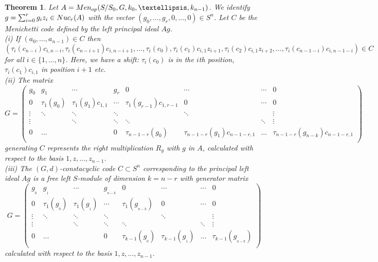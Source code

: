 \documentclass[11pt]{amsart}
\theoremstyle{plain}
\newtheorem{theorem}{Theorem}[section]
\theoremstyle{definition}
\begin{document}
\begin{theorem}\label{thm:newTheorem3.2}
Let $A={\rm Men}_{op}(S/S_0,G, k_0,\dots,k_{n-1})$.  We identify $g=\sum_{i=0}^{r}g_iz_i\in {\rm Nuc}_r(A)$
with the vector $(g_0,\dots,g_{r},0,\dots,0)\in S^n$. Let $C$ be the Menichetti code defined by the left principal ideal $Ag$.
\\ (i)  If $(a_0,\dots,a_{n-1})\in C$ then
$$( \tau_i(c_{n-i}) c_{i,n-i}  ,  \tau_i(c_{n-i+1}) c_{i,n-i+1} ,\dots, \tau_i(c_0), \tau_i(c_1) c_{i,1} z_{i+1}, \tau_i(c_2) c_{i,1} z_{i+2},\dots, \tau_i(c_{n-1-i}) c_{i,n-1-i} ) \in  C$$
for all $i\in \{1,\dots,n \}$.
 Here, we have a shift: $ \tau_i(c_0) $ is in the $i$th position, $\tau_i(c_1) c_{i,1} $ in position $i+1$ etc.
\\ (ii)
 The matrix
 $$G= \left(
 \begin{array}{cccccccc}
 g_{0} &g_{1} &        \cdots&          g_{r}& 0 &\cdots &\cdots & 0\\
 0 & \tau_1(g_{0}) & \tau_1(g_{1})c_{1,1} &\cdots & \tau_{1}(g_{r-1})c_{1,r-1} & 0 &\cdots & 0\\
 \vdots &\ddots &\ddots &\ddots & &\ddots & &\vdots\\
 \vdots & &\ddots &\ddots &\ddots & &\ddots &\vdots\\
 0 &\ldots & &0 & \tau_{n-1-r}(g_{0}) & \tau_{n-1-r}(g_{1})c_{n-1-r,1} &\ldots & \tau_{n-1-r}(g_{{n-k}})c_{n-1-r,1} \\
 \end{array}
 \right)
 $$
  generating $C$ represents the right multiplication $R_g$ with $g$ in $A$,
calculated with respect to the basis $1,z,\dots,z_{n-1}$.
\\ (iii)
The $(G,d)$-constacyclic code $C\subset S^n$ corresponding to the principal left ideal
$Ag $ is a free left $S$-module of dimension $k=n-r$ with generator matrix
$$
 G= \left(
 \begin{array}{cccccccc}
 g_{_0} &g_{_1} &\cdots&g_{_{n-k}}& 0 &\cdots &\cdots & 0\\
 0 & \tau_1(g_{_0}) & \tau_1(g_{_1}) &\cdots & \tau_{1}(g_{_{n-k}}) & 0 &\cdots & 0\\
 \vdots &\ddots &\ddots &\ddots & &\ddots & &\vdots\\
 \vdots & &\ddots &\ddots &\ddots & &\ddots &\vdots\\
 0 &\ldots & &0 & \tau_{k-1}(g_{_0}) & \tau_{k-1}(g_{_1}) &\ldots & \tau_{k-1}(g_{_{n-k}})\\
 \end{array}
 \right)
 $$
calculated with respect to the basis $1,z,\dots,z_{n-1}$.
\end{theorem}
\end{document}
